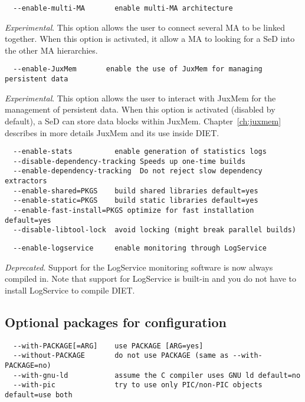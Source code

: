 {\footnotesize
\begin{verbatim}
  --enable-multi-MA       enable multi-MA architecture
\end{verbatim}
}
\noindent \textit{Experimental}.  This option allows the user to
connect several MA to be linked together. When this option is
activated, it allow a MA to looking for a SeD into the other MA
hierarchies.

{\footnotesize
\begin{verbatim}
  --enable-JuxMem       enable the use of JuxMem for managing persistent data
\end{verbatim}
}
\noindent \textit{Experimental}.  This option allows the user to
interact with JuxMem for the management of persistent data. When
this option is activated (disabled by default), a SeD can store data
blocks within JuxMem. Chapter~\ref{ch:juxmem} describes in more
details JuxMem and its use inside DIET.

{\footnotesize
\begin{verbatim}
  --enable-stats          enable generation of statistics logs
  --disable-dependency-tracking Speeds up one-time builds
  --enable-dependency-tracking  Do not reject slow dependency extractors
  --enable-shared=PKGS    build shared libraries default=yes
  --enable-static=PKGS    build static libraries default=yes
  --enable-fast-install=PKGS optimize for fast installation default=yes
  --disable-libtool-lock  avoid locking (might break parallel builds)
\end{verbatim}
}

{\footnotesize
\begin{verbatim}
  --enable-logservice     enable monitoring through LogService
\end{verbatim}
}
\noindent \textit{Deprecated}.  Support for the LogService monitoring
software is now always compiled in.  Note that support for LogService
is built-in and you do not have to install LogService to compile
DIET.

\subsection{Optional packages for configuration}


{\footnotesize
\begin{verbatim}
  --with-PACKAGE[=ARG]    use PACKAGE [ARG=yes]
  --without-PACKAGE       do not use PACKAGE (same as --with-PACKAGE=no)
  --with-gnu-ld           assume the C compiler uses GNU ld default=no
  --with-pic              try to use only PIC/non-PIC objects default=use both
\end{verbatim}
}

